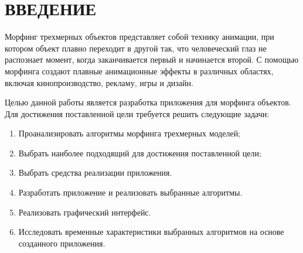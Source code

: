 \chapter*{ВВЕДЕНИЕ}


Морфинг трехмерных объектов представляет собой технику анимации, при котором объект плавно переходит в другой так, что человеческий глаз не распознает момент, когда заканчивается первый и начинается второй. С помощью морфинга создают плавные анимационные эффекты в различных областях, включая кинопроизводство, рекламу, игры и дизайн. 

Целью данной работы является разработка приложения
для морфинга объектов. Для достижения поставленной цели
требуется решить следующие задачи:

\begin{enumerate}
\item Проанализировать алгоритмы морфинга трехмерных моделей;
\item Выбрать наиболее подходящий для достижения поставленной цели;
\item Выбрать средства реализации приложения.
\item Разработать приложение и реализовать выбранные алгоритмы.
\item Реализовать графический интерфейс.
\item Исследовать временные характеристики выбранных алгоритмов на основе созданного приложения.
\end{enumerate}